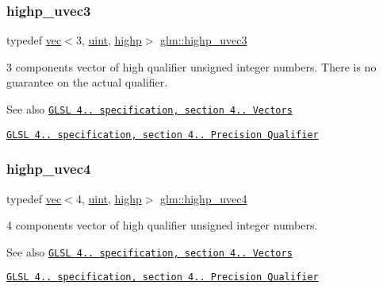 \subsubsection{\texorpdfstring{highp\+\_\+uvec3}{highp\_uvec3}}
{\footnotesize\ttfamily typedef \hyperlink{structglm_1_1vec}{vec}$<$3, \hyperlink{group__core__precision_ga4fd29415871152bfb5abd588334147c8}{uint}, \hyperlink{namespaceglm_a36ed105b07c7746804d7fdc7cc90ff25ac6f7eab42eacbb10d59a58e95e362074}{highp}$>$ \hyperlink{group__core__precision_ga2e16953ad75ce0c6d7faa921ca006ce5}{glm\+::highp\+\_\+uvec3}}

3 components vector of high qualifier unsigned integer numbers. There is no guarantee on the actual qualifier.

\begin{DoxySeeAlso}{See also}
\href{http://www.opengl.org/registry/doc/GLSLangSpec.4.20.8.pdf}{\tt G\+L\+SL 4.. specification, section 4.. Vectors} 

\href{http://www.opengl.org/registry/doc/GLSLangSpec.4.20.8.pdf}{\tt G\+L\+SL 4.. specification, section 4.. Precision Qualifier} 
\end{DoxySeeAlso}
\mbox{\label{group__core__precision_gae48d6e9a99afc33e6fa51e5d576dfd1a}} 
\subsubsection{\texorpdfstring{highp\+\_\+uvec4}{highp\_uvec4}}
{\footnotesize\ttfamily typedef \hyperlink{structglm_1_1vec}{vec}$<$4, \hyperlink{group__core__precision_ga4fd29415871152bfb5abd588334147c8}{uint}, \hyperlink{namespaceglm_a36ed105b07c7746804d7fdc7cc90ff25ac6f7eab42eacbb10d59a58e95e362074}{highp}$>$ \hyperlink{group__core__precision_gae48d6e9a99afc33e6fa51e5d576dfd1a}{glm\+::highp\+\_\+uvec4}}

4 components vector of high qualifier unsigned integer numbers.

\begin{DoxySeeAlso}{See also}
\href{http://www.opengl.org/registry/doc/GLSLangSpec.4.20.8.pdf}{\tt G\+L\+SL 4.. specification, section 4.. Vectors} 

\href{http://www.opengl.org/registry/doc/GLSLangSpec.4.20.8.pdf}{\tt G\+L\+SL 4.. specification, section 4.. Precision Qualifier} 
\end{DoxySeeAlso}
\mbox{\label{group__core__precision_gad588ab946806864499d6559c186ce3ba}} 
